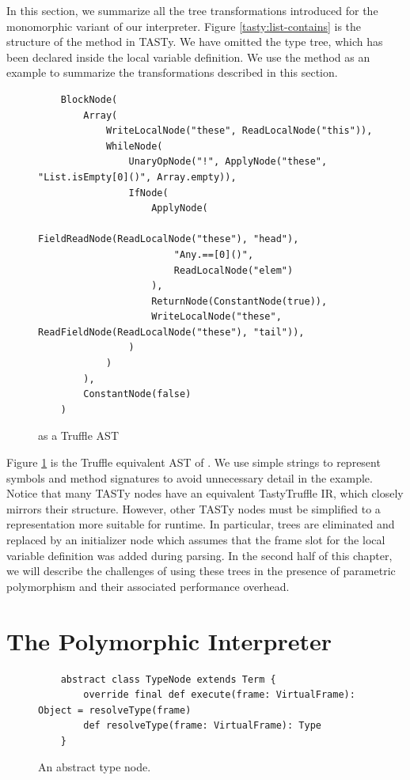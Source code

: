 In this section, we summarize all the tree transformations introduced for the monomorphic variant of our interpreter.
Figure \ref{tasty:list-contains} is the structure of the  method in TASTy.
We have omitted the type tree, which has been declared inside the local variable definition.
We use the  method as an example to summarize the transformations described in this section.

\begin{figure}[!htb]
	\begin{verbatim}
	BlockNode(
		Array(
			WriteLocalNode("these", ReadLocalNode("this")),
			WhileNode(
				UnaryOpNode("!", ApplyNode("these", "List.isEmpty[0]()", Array.empty)),
				IfNode(
					ApplyNode(
						FieldReadNode(ReadLocalNode("these"), "head"), 
						"Any.==[0]()", 
						ReadLocalNode("elem")
					),
					ReturnNode(ConstantNode(true)),
					WriteLocalNode("these", ReadFieldNode(ReadLocalNode("these"), "tail")),	
				)   
			)
		),
		ConstantNode(false)
	)
	\end{verbatim}
	\caption{ as a Truffle AST}
	\label{example:truffle-list-contains}
\end{figure}

Figure \ref{example:truffle-list-contains} is the Truffle equivalent AST of .
We use simple strings to represent symbols and method signatures to avoid unnecessary detail in the example.
Notice that many TASTy nodes have an equivalent TastyTruffle IR, which closely mirrors their structure.
However, other TASTy nodes must be simplified to a representation more suitable for runtime.
In particular,  trees are eliminated and replaced by an initializer node which assumes that the frame slot for the local variable definition was added during parsing.
In the second half of this chapter, we will describe the challenges of using these trees in the presence of parametric polymorphism and their associated performance overhead.

\section{The Polymorphic Interpreter}
\label{implementation:specialization}

\begin{figure}[!htb]
	\begin{verbatim}
	abstract class TypeNode extends Term {
		override final def execute(frame: VirtualFrame): Object = resolveType(frame)
		def resolveType(frame: VirtualFrame): Type 
	}
	\end{verbatim}
	\caption{An abstract type node.}
	\label{impl:type-node}
\end{figure}

